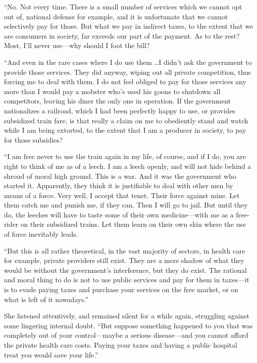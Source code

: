 ``No. Not every time. There is a small number of services which we cannot opt out of, national defense for example, and it is unfortunate that we cannot selectively pay for those. But what we pay in indirect taxes, to the extent that we are consumers in society, far exceeds our part of the payment. As to the rest? Most, I'll never use---why should I foot the bill?

``And even in the rare cases where I do use them \ldots I didn't ask the government to provide those services. They did anyway, wiping out all private competition, thus forcing me to deal with them. I do not feel obliged to pay for those services any more than I would pay a mobster who's used his goons to shutdown all competitors, leaving his diner the only one in operation. If the government nationalizes a railroad, which I had been perfectly happy to use, or provides subsidized train fare, is that really a claim on me to obediently stand and watch while I am being extorted, to the extent that I am a producer in society, to pay for those subsidies?

``I am free never to use the train again in my life, of course, and if I do, you are right to think of me as of a leech. I am a leech openly, and will not hide behind a shroud of moral high ground. This is a war. And it was the government who started it. Apparently, they think it is justifiable to deal with other men by means of a force. Very well, I accept that tenet. Their force against mine. Let them catch me and punish me, if they can. Then I will go to jail. But until they do, the leeches will have to taste some of their own medicine---with me as a free-rider on their subsidized trains. Let them learn on their own skin where the use of force inevitably leads.

``But this is all rather theoretical, in the vast majority of sectors, in health care for example, private providers still exist. They are a mere shadow of what they would be without the government's interference, but they do exist. The rational and moral thing to do is not to use public services and pay for them in taxes---it is to evade paying taxes and purchase your services on the free market, or on what is left of it nowadays.''

She listened attentively, and remained silent for a while again, struggling against some lingering internal doubt. ``But suppose something happened to you that was completely out of your control---maybe a serious disease---and you cannot afford the private health care costs. Paying your taxes and having a public hospital treat you would save your life.''


